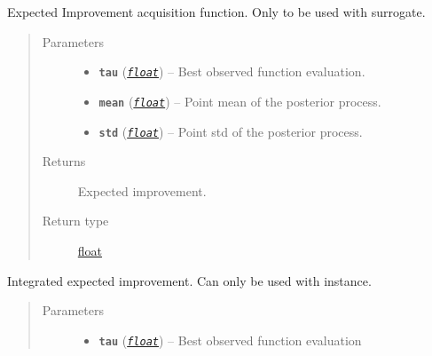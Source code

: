 \documentclass[letterpaper,10pt,english]{sphinxmanual}
\begin{document}
\begin{fulllineitems}

\begin{fulllineitems}
\label{pyGPGO.acquisition:pyGPGO.acquisition.Acquisition.tExpectedImprovement}
Expected Improvement acquisition function. Only to be used with  surrogate.
\begin{quote}\begin{description}
\item[{Parameters}] \leavevmode\begin{itemize}
\item {} 
\textbf{\texttt{tau}} (\href{https://docs.python.org/2/library/functions.html\#float}{\emph{\texttt{float}}}) -- Best observed function evaluation.

\item {} 
\textbf{\texttt{mean}} (\href{https://docs.python.org/2/library/functions.html\#float}{\emph{\texttt{float}}}) -- Point mean of the posterior process.

\item {} 
\textbf{\texttt{std}} (\href{https://docs.python.org/2/library/functions.html\#float}{\emph{\texttt{float}}}) -- Point std of the posterior process.

\end{itemize}

\item[{Returns}] \leavevmode
Expected improvement.

\item[{Return type}] \leavevmode
\href{https://docs.python.org/2/library/functions.html\#float}{float}

\end{description}\end{quote}

\end{fulllineitems}


\begin{fulllineitems}
\label{pyGPGO.acquisition:pyGPGO.acquisition.Acquisition.tIntegratedExpectedImprovement}
Integrated expected improvement. Can only be used with  instance.
\begin{quote}\begin{description}
\item[{Parameters}] \leavevmode\begin{itemize}
\item {} 
\textbf{\texttt{tau}} (\href{https://docs.python.org/2/library/functions.html\#float}{\emph{\texttt{float}}}) -- Best observed function evaluation


\end{itemize}
\end{description}
\end{quote}
\end{fulllineitems}
\end{fulllineitems}
\end{document}
